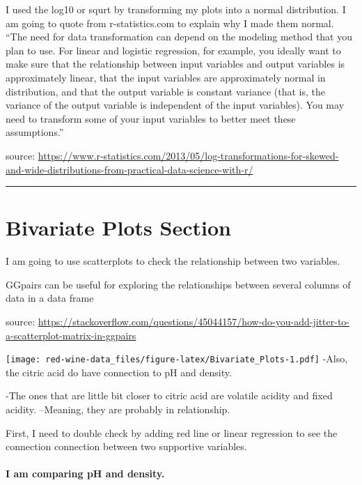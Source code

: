 \documentclass[]{article}
\let\oldparagraph\paragraph
\renewcommand{\paragraph}[1]{\oldparagraph{#1}\mbox{}}
\begin{document}
I used the log10 or squrt by transforming my plots into a normal
distribution. I am going to quote from r-statistics.com to explain why I
made them normal. ``The need for data transformation can depend on the
modeling method that you plan to use. For linear and logistic
regression, for example, you ideally want to make sure that the
relationship between input variables and output variables is
approximately linear, that the input variables are approximately normal
in distribution, and that the output variable is constant variance (that
is, the variance of the output variable is independent of the input
variables). You may need to transform some of your input variables to
better meet these assumptions.''

source:
\url{https://www.r-statistics.com/2013/05/log-transformations-for-skewed-and-wide-distributions-from-practical-data-science-with-r/}

\begin{center}\rule{0.5\linewidth}{\linethickness}\end{center}

\section{Bivariate Plots Section}\label{bivariate-plots-section}

I am going to use scatterplots to check the relationship between two
variables.

GGpairs can be useful for exploring the relationships between several
columns of data in a data frame

source:
\url{https://stackoverflow.com/questions/45044157/how-do-you-add-jitter-to-a-scatterplot-matrix-in-ggpairs}

\texttt{[image: red-wine-data\_files/figure-latex/Bivariate\_Plots-1.pdf]}
-Also, the citric acid do have connection to pH and density.

-The ones that are little bit closer to citric acid are volatile acidity
and fixed acidity. --Meaning, they are probably in relationship.

First, I need to double check by adding red line or linear regression to
see the connection connection between two supportive variables.

\paragraph{I am comparing pH and
density.}\label{i-am-comparing-ph-and-density.}
\end{document}
